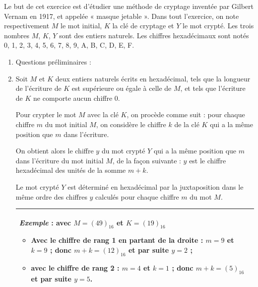 \begin{exercice}
    Le but de cet exercice est d'étudier une méthode de cryptage inventée par Gilbert Vernam en 1917, et appelée «  masque jetable  ».
    Dans tout l'exercice, on note respectivement $M$ le mot initial, $K$ la clé de cryptage et $Y$ le mot crypté.
    Les trois nombres $M$, $K$, $Y$ sont des entiers naturels.
    Les chiffres hexadécimaux sont notés 0, 1, 2, 3, 4, 5, 6, 7, 8, 9, A, B, C, D, E, F.
    
    \begin{enumerate}
        \item Questions préliminaires :
        \item Soit $M$ et $K$ deux entiers naturels écrits en hexadécimal, tels que la longueur de l'écriture de $K$ est supérieure ou égale à celle de $M$, et tels que l'écriture de $K$ ne comporte aucun chiffre $0$.
              
              Pour crypter le mot $M$ avec la clé $K$, on procède comme suit : pour chaque  chiffre $m$ du mot
              initial $M$, on considère le chiffre $k$ de la clé $K$ qui a la même position que $m$ dans l'écriture.
              
              On obtient alors le chiffre $y$ du mot crypté $Y$ qui a la même position que $m$ dans l'écriture du mot initial $M$, de la façon suivante : $y$ est le chiffre hexadécimal des unités de la somme $m + k$.
              
              Le mot crypté $Y$ est déterminé en hexadécimal par la juxtaposition dans le même ordre des
              chiffres $y$ calculés pour chaque chiffre $m$ du mot $M$.
              \begin{center}
                  \begin{tabularx}{\linewidth}{|X|}\hline
                      \emph{Exemple} : avec $M =(49)_{16}$ et $K = (19)_{16}$
                      \begin{itemize}
                          \item Avec le chiffre de rang 1 en partant de la droite : $m = 9$ et $k = 9$ ; donc $m + k = (12)_{16}$ et par suite $y = 2$ ;
                          \item avec le chiffre de rang 2 : $m = 4$ et $k = 1$ ; donc $m +k = (5)_{16}$ et par suite $y = 5$.
                      \end{itemize} \\\hline
                  \end{tabularx}
              \end{center}
              

\end{enumerate}
\end{exercice}
